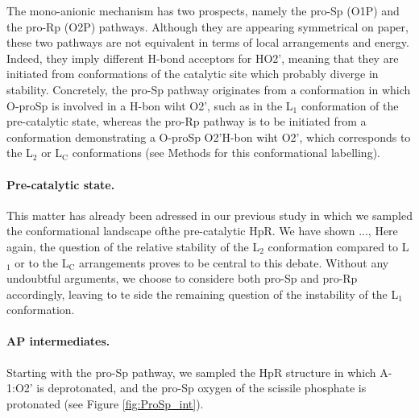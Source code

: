 \documentclass[journal=jacsat,manuscript=article]{achemso}
\begin{document}
The mono-anionic mechanism has two prospects, namely the pro-Sp (O1P) and the pro-Rp (O2P) pathways.
Although they are appearing symmetrical on paper, these two pathways are not equivalent in terms of local arrangements and energy.
Indeed, they imply different H-bond acceptors for HO2', 
meaning that they are initiated from conformations of the catalytic site which probably diverge in stability.
Concretely, the pro-Sp pathway originates from a conformation in which O-proSp is involved in a H-bon wiht O2', 
such as in the L$_\mathrm{1}$ conformation of the pre-catalytic state,
whereas the pro-Rp pathway is to be initiated from a conformation demonstrating a O-proSp O2'H-bon wiht O2', 
which corresponds to the L$_\mathrm{2}$ or L$_\mathrm{C}$ conformations (see Methods for this conformational labelling).




\paragraph{Pre-catalytic state.}
This matter has already been adressed in our previous study \cite{forget} in which we sampled the conformational landscape ofthe pre-catalytic HpR.
We have shown ...,  
Here again, the question of the relative stability of the L$_\mathrm{2}$ conformation compared to L$_\mathrm{1}$ 
or to the L$_\mathrm{C}$ arrangements proves to be central to this debate. Without any undoubtful arguments,
we choose to considere both pro-Sp and pro-Rp accordingly, leaving to te side the remaining question of the instability of the L$_\mathrm{1}$ conformation.



\paragraph{AP intermediates. }

Starting with the pro-Sp pathway, we sampled the HpR structure in which A-1:O2' is deprotonated, 
and the pro-Sp oxygen of the scissile phosphate is protonated (see Figure \ref{fig:ProSp_int}).
\end{document}
